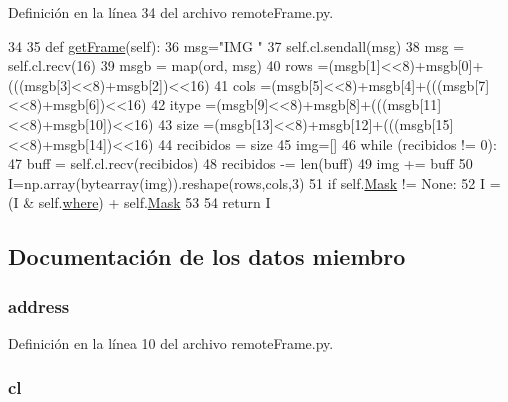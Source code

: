 Definición en la línea 34 del archivo remote\+Frame.\+py.


\begin{DoxyCode}
34 
35     \textcolor{keyword}{def }\hyperlink{classremoteFrame_1_1remoteFrame_af9458ce42581fff9b03a7e20c1e333d0}{getFrame}(self):
36         msg=\textcolor{stringliteral}{"IMG       "}
37         self.cl.sendall(msg)
38         msg = self.cl.recv(16)
39         msgb = map(ord, msg)
40         rows =(msgb[1]<<8)+msgb[0]+(((msgb[3]<<8)+msgb[2])<<16)
41         cols =(msgb[5]<<8)+msgb[4]+(((msgb[7]<<8)+msgb[6])<<16)
42         itype =(msgb[9]<<8)+msgb[8]+(((msgb[11]<<8)+msgb[10])<<16)
43         size =(msgb[13]<<8)+msgb[12]+(((msgb[15]<<8)+msgb[14])<<16)
44         recibidos = size
45         img=[]
46         \textcolor{keywordflow}{while} (recibidos != 0):
47             buff = self.cl.recv(recibidos)
48             recibidos -= len(buff)
49             img += buff
50         I=np.array(bytearray(img)).reshape(rows,cols,3)
51         \textcolor{keywordflow}{if} self.\hyperlink{classremoteFrame_1_1remoteFrame_a291536e8bf5e2f42dec8ed3f82b13487}{Mask} != \textcolor{keywordtype}{None}:
52             I = (I & self.\hyperlink{classremoteFrame_1_1remoteFrame_aec4a6f499c74a3d34d4dfe9930c9e115}{where}) + self.\hyperlink{classremoteFrame_1_1remoteFrame_a291536e8bf5e2f42dec8ed3f82b13487}{Mask}
53 
54         \textcolor{keywordflow}{return} I
\end{DoxyCode}


\subsection{Documentación de los datos miembro}
\hypertarget{classremoteFrame_1_1remoteFrame_ade5a18d52133ef21f211020ceb464c07}{
\subsubsection[{address}]{\setlength{\rightskip}{0pt plus 5cm}address}}\label{classremoteFrame_1_1remoteFrame_ade5a18d52133ef21f211020ceb464c07}


Definición en la línea 10 del archivo remote\+Frame.\+py.

\hypertarget{classremoteFrame_1_1remoteFrame_a60d28e417cda8ed5b817c14e537c5629}{
\subsubsection[{cl}]{\setlength{\rightskip}{0pt plus 5cm}cl}}\label{classremoteFrame_1_1remoteFrame_a60d28e417cda8ed5b817c14e537c5629}


